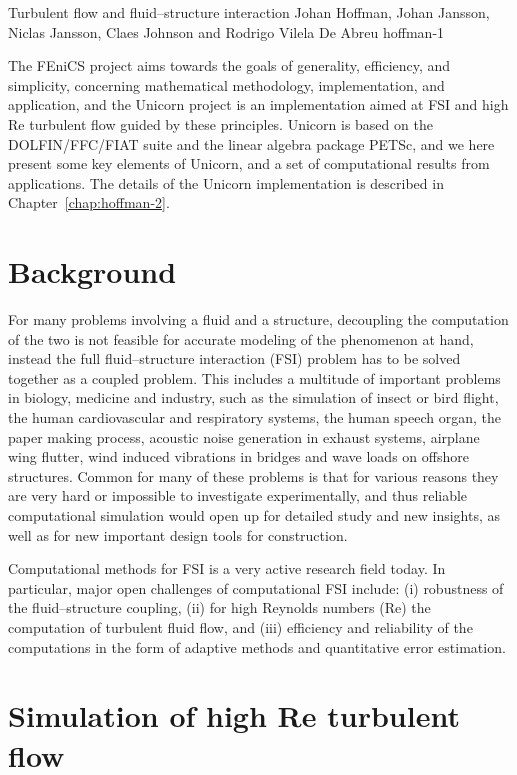               {Turbulent flow and fluid--structure interaction}
              {Johan Hoffman, Johan Jansson, Niclas Jansson, Claes Johnson and Rodrigo Vilela De Abreu}
              {hoffman-1}

The FEniCS project aims towards the goals of
generality, efficiency, and simplicity, concerning
mathematical methodology, implementation, and
application, and the Unicorn project is an
implementation aimed at FSI and high Re turbulent flow
guided by these principles. Unicorn is based on the
DOLFIN/FFC/FIAT suite and the linear algebra package
PETSc, and we here present some key elements of
Unicorn, and a set of computational results from
applications. The details of the Unicorn
implementation is described in
Chapter~\ref{chap:hoffman-2}.

\section{Background}

For many problems involving a fluid and a structure,
decoupling the computation of the two is not feasible
for accurate modeling of the phenomenon at hand,
instead the full fluid--structure interaction (FSI)
problem has to be solved together as a coupled
problem. This includes a multitude of important
problems in biology, medicine and industry, such as
the simulation of insect or bird flight, the human
cardiovascular and respiratory systems, the human
speech organ, the paper making process, acoustic noise
generation in exhaust systems, airplane wing flutter,
wind induced vibrations in bridges and wave loads on
offshore structures. Common for many of these problems
is that for various reasons they are very hard or
impossible to investigate experimentally, and thus
reliable computational simulation would open up for
detailed study and new insights, as well as for new
important design tools for construction.

Computational methods for FSI is a very active
research field today. In particular, major open
challenges of computational FSI include: (i)
robustness of the fluid--structure coupling, (ii) for
high Reynolds numbers (Re) the computation of
turbulent fluid flow, and (iii) efficiency and
reliability of the computations in the form of
adaptive methods and quantitative error estimation.

\section{Simulation of high Re turbulent flow}

